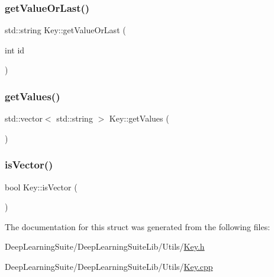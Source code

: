 \mbox{\label{struct_key_a74d0f7686b859dabde58e729cf9f7b41}} 
\subsubsection{\texorpdfstring{get\+Value\+Or\+Last()}{getValueOrLast()}}
{\footnotesize\ttfamily std\+::string Key\+::get\+Value\+Or\+Last (\begin{DoxyParamCaption}\item[{int}]{id }\end{DoxyParamCaption})}

\mbox{\label{struct_key_ac97e2bba994c9571e32083e1fb91c4f5}} 
\subsubsection{\texorpdfstring{get\+Values()}{getValues()}}
{\footnotesize\ttfamily std\+::vector$<$ std\+::string $>$ Key\+::get\+Values (\begin{DoxyParamCaption}{ }\end{DoxyParamCaption})}

\mbox{\label{struct_key_a23777b784264c6498efaa593bc29f48a}} 
\subsubsection{\texorpdfstring{is\+Vector()}{isVector()}}
{\footnotesize\ttfamily bool Key\+::is\+Vector (\begin{DoxyParamCaption}{ }\end{DoxyParamCaption})}



The documentation for this struct was generated from the following files\+:\begin{DoxyCompactItemize}
\item 
Deep\+Learning\+Suite/\+Deep\+Learning\+Suite\+Lib/\+Utils/\hyperlink{_key_8h}{Key.\+h}\item 
Deep\+Learning\+Suite/\+Deep\+Learning\+Suite\+Lib/\+Utils/\hyperlink{_key_8cpp}{Key.\+cpp}\end{DoxyCompactItemize}

